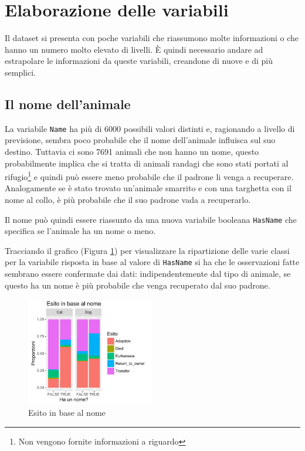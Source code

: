
\section{Elaborazione delle variabili}

Il dataset si presenta con poche variabili che riassumono molte informazioni o che hanno un numero molto elevato di livelli. \`E quindi necessario andare ad estrapolare le informazioni da queste variabili, creandone di nuove e di più semplici.

\subsection{Il nome dell'animale}

La variabile \texttt{Name} ha più di 6000 possibili valori distinti e, ragionando a livello di previsione, sembra poco probabile che il nome dell'animale influisca sul suo destino. Tuttavia ci sono 7691 animali che non hanno un nome, questo probabilmente implica che si tratta di animali randagi che sono stati portati al rifugio\footnote{Non vengono fornite informazioni a riguardo} e quindi può essere meno probabile che il padrone li venga a recuperare. Analogamente se è stato trovato un'animale smarrito e con una targhetta con il nome al collo, è più probabile che il suo padrone vada a recuperarlo.

Il nome può quindi essere riassunto da una nuova variabile booleana \texttt{HasName} che specifica se l'animale ha un nome o meno.

Tracciando il grafico (Figura \ref{fig-has-name}) per visualizzare la ripartizione delle varie classi per la variabile risposta in base al valore di \texttt{HasName} si ha che le osservazioni fatte sembrano essere confermate dai dati: indipendentemente dal tipo di animale, se questo ha un nome è più probabile che venga recuperato dal suo padrone.

\begin{figure}[htbp]
	\centering
	\includegraphics[width=0.5\textwidth]{./grafici/esito_has_name.pdf}
	\caption{Esito in base al nome}\label{fig-has-name}
\end{figure}

